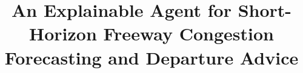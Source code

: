 \documentclass[conference]{IEEEtran}
\begin{document}
\title{An Explainable Agent for Short-Horizon Freeway Congestion Forecasting and Departure Advice}
\author{}
\maketitle









\end{document}
